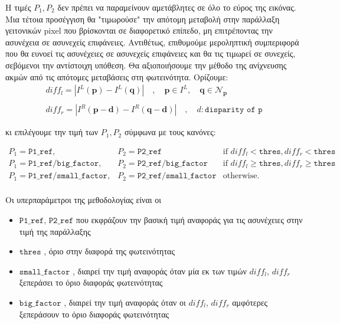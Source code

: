 Η τιμές $P_1, P_2$ δεν πρέπει να παραμείνουν αμετάβλητες σε όλο το εύρος της εικόνας. Μια τέτοια προσέγγιση θα "τιμωρούσε" την απότομη μεταβολή στην παράλλαξη γειτονικών \e pixel \g που βρίσκονται σε διαφορετικό επίπεδο, μη επιτρέποντας την ασυνέχεια σε ασυνεχείς επιφάνειες. Αντιθέτως, επιθυμούμε μεροληπτική συμπεριφορά που θα ευνοεί τις ασυνέχειες σε ασυνεχείς επιφάνειες και θα τις τιμωρεί σε συνεχείς, σεβόμενοι την αντίστοιχη υπόθεση. Θα αξιοποιήσουμε την μέθοδο της ανίχνευσης ακμών από τις απότομες μεταβάσεις στη φωτεινότητα. Ορίζουμε: \e
\[
	\begin{array}{c}
		diff_l = |I^L(\mathbf{p}) - I^L(\mathbf{q})|\quad, \quad \mathbf{p} \in I^L, \quad \mathbf{q} \in \mathcal{N}_{\mathbf{p}} \\
	 \\
		diff_r = |I^R(\mathbf{p}-\mathbf{d}) - I^R(\mathbf{q}-\mathbf{d})|\quad , \quad d: \texttt{disparity of p}
	\end{array}
\]

\g κι επιλέγουμε την τιμή των $P_1, P_2$ σύμφωνα με τους κανόνες: \e

\[ \begin{array}{lll} 
P_1 = \texttt{P1\_ref}, &P_2 = \texttt{P2\_ref} & 
\text{if $diff_l < \texttt{thres}, diff_r < \texttt{thres}$} \\ 
P_1 = \texttt{P1\_ref} / \texttt{big\_factor}, &P_2 = \texttt{P2\_ref} / \texttt{big\_factor} & 
\text{if $diff_l \geq \texttt{thres}, diff_r \geq \texttt{thres}$} \\ 
P_1 = \texttt{P1\_ref} / \texttt{small\_factor}, &P_2 = \texttt{P2\_ref} / \texttt{small\_factor} & 
\text{otherwise.} \\ 
\end{array} \]

\g Οι υπερπαράμετροι της μεθοδολογίας είναι οι

\begin{itemize}
	\item \e $\texttt{P1\_ref, P2\_ref}$ \g που εκφράζουν την βασική τιμή αναφοράς για τις ασυνέχειες στην τιμή της παράλλαξης
	\item \e $\texttt{thres}$ \g, όριο στην διαφορά της φωτεινότητας
	\item \e $\texttt{small\_factor}$ \g, διαιρεί την τιμή αναφοράς όταν μία εκ των τιμών $diff_l$, $diff_r$ ξεπεράσει το όριο διαφοράς φωτεινότητας
	\item \e $\texttt{big\_factor}$ \g, διαιρεί την τιμή αναφοράς όταν οι $diff_l$, $diff_r$ αμφότερες ξεπεράσουν το όριο διαφοράς φωτεινότητας
\end{itemize}

